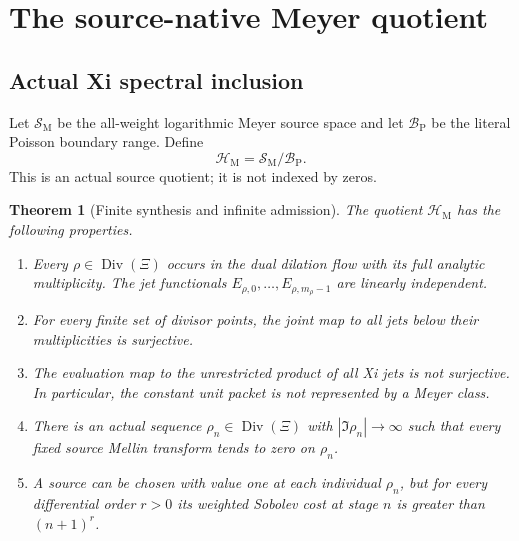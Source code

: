\documentclass[11pt]{article}
\newtheorem{theorem}{Theorem}[section]
\theoremstyle{definition}
\theoremstyle{remark}
\newcommand{\cB}{\mathcal B}
\newcommand{\cH}{\mathcal H}
\newcommand{\cS}{\mathcal S}
\newcommand{\Div}{\operatorname{Div}}
\begin{document}
\section{The source-native Meyer quotient}

\subsection{Actual Xi spectral inclusion}

Let \(\cS_{\mathrm{M}}\) be the all-weight logarithmic Meyer source space
and let \(\cB_{\mathrm{P}}\) be the literal Poisson boundary range.  Define
\[
                         \cH_{\mathrm M}
                         =\cS_{\mathrm M}/\cB_{\mathrm P}.
\tag{5.1}\label{eq:meyer-cohomology}
\]
This is an actual source quotient; it is not indexed by zeros.

\begin{theorem}[Finite synthesis and infinite admission]
\label{thm:meyer-wall}
The quotient \(\cH_{\mathrm M}\) has the following properties.

\begin{enumerate}[label=\textup{(\roman*)},leftmargin=2em]
\item Every \(\rho\in\Div(\Xi)\) occurs in the dual dilation flow with
      its full analytic multiplicity.  The jet functionals
      \(E_{\rho,0},\ldots,E_{\rho,m_\rho-1}\) are linearly independent.
\item For every finite set of divisor points, the joint map to all jets
      below their multiplicities is surjective.
\item The evaluation map to the unrestricted product of all Xi jets is
      not surjective.  In particular, the constant unit packet is not
      represented by a Meyer class.
\item There is an actual sequence \(\rho_n\in\Div(\Xi)\) with
      \(|\Im\rho_n|\to\infty\) such that every fixed source Mellin
      transform tends to zero on \(\rho_n\).
\item A source can be chosen with value one at each individual
      \(\rho_n\), but for every differential order \(r>0\) its weighted
      Sobolev cost at stage \(n\) is greater than \((n+1)^r\).
\end{enumerate}
\end{theorem}
\end{document}
